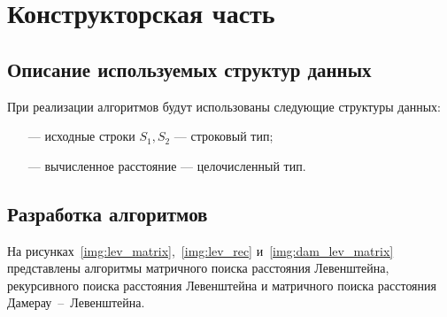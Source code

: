 \chapter{Конструкторская часть}

\section{Описание используемых структур данных}

При реализации алгоритмов будут использованы следующие структуры данных:

\begin{itemize}
	\item[---] исходные строки $S_{1}, S_{2}$ --- строковый тип;
	\item[---] вычисленное расстояние --- целочисленный тип.
\end{itemize}

\section{Разработка алгоритмов}

На рисунках~\ref{img:lev_matrix},~\ref{img:lev_rec} и~\ref{img:dam_lev_matrix} представлены алгоритмы матричного поиска расстояния Левенштейна, рекурсивного поиска расстояния Левенштейна и матричного поиска расстояния Дамерау~--~Левенштейна.


